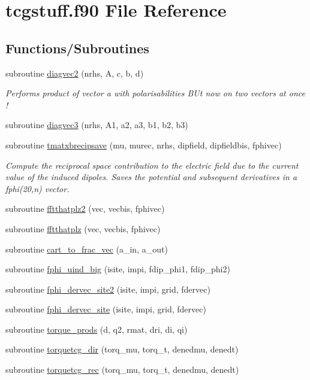 \hypertarget{tcgstuff_8f90}{\section{tcgstuff.\-f90 File Reference}
\label{tcgstuff_8f90}
}
\subsection*{Functions/\-Subroutines}
\begin{DoxyCompactItemize}
\item 
subroutine \hyperlink{tcgstuff_8f90_ad71830f307e9d1dee9fbbdfa5e08f0f0}{diagvec2} (nrhs, A, c, b, d)
\begin{DoxyCompactList}\small\item\em Performs product of vector a with polarisabilities B\-Ut now on two vectors at once ! \end{DoxyCompactList}\item 
subroutine \hyperlink{tcgstuff_8f90_a6a284f7e67cb89c05d74e78ed202df0c}{diagvec3} (nrhs, A1, a2, a3, b1, b2, b3)
\item 
subroutine \hyperlink{tcgstuff_8f90_a794c752c12924c34a5a35ed71bd9acb5}{tmatxbrecipsave} (mu, murec, nrhs, dipfield, dipfieldbis, fphivec)
\begin{DoxyCompactList}\small\item\em Compute the reciprocal space contribution to the electric field due to the current value of the induced dipoles. Saves the potential and subsequent derivatives in a fphi(20,n) vector. \end{DoxyCompactList}\item 
subroutine \hyperlink{tcgstuff_8f90_a9fe966fe3fbd40574bc9b419652d13a2}{fftthatplz2} (vec, vecbis, fphivec)
\item 
subroutine \hyperlink{tcgstuff_8f90_ae3902cb1590da7ce74ec8490f93c77d0}{fftthatplz} (vec, vecbis, fphivec)
\item 
subroutine \hyperlink{tcgstuff_8f90_a1263dde85bf01f8c62f8e42bb52d99df}{cart\-\_\-to\-\_\-frac\-\_\-vec} (a\-\_\-in, a\-\_\-out)
\item 
subroutine \hyperlink{tcgstuff_8f90_aeee46c6ce00e36c7d98ae8432709e865}{fphi\-\_\-uind\-\_\-big} (isite, impi, fdip\-\_\-phi1, fdip\-\_\-phi2)
\item 
subroutine \hyperlink{tcgstuff_8f90_a3f36c3e3c446662eb2ec5e8737829919}{fphi\-\_\-dervec\-\_\-site2} (isite, impi, grid, fdervec)
\item 
subroutine \hyperlink{tcgstuff_8f90_a56b20b19e92506a335fe0ff780d96b01}{fphi\-\_\-dervec\-\_\-site} (isite, impi, grid, fdervec)
\item 
subroutine \hyperlink{tcgstuff_8f90_abe3f1179d9b7849d6d4ba517b657603b}{torque\-\_\-prods} (d, q2, rmat, dri, di, qi)
\item 
subroutine \hyperlink{tcgstuff_8f90_ae8b6f24b23c119cca1e380be87071855}{torquetcg\-\_\-dir} (torq\-\_\-mu, torq\-\_\-t, denedmu, denedt)
\item 
subroutine \hyperlink{tcgstuff_8f90_a28871a2190f2c03c8e36f53767276849}{torquetcg\-\_\-rec} (torq\-\_\-mu, torq\-\_\-t, denedmu, denedt)
\end{DoxyCompactItemize}


